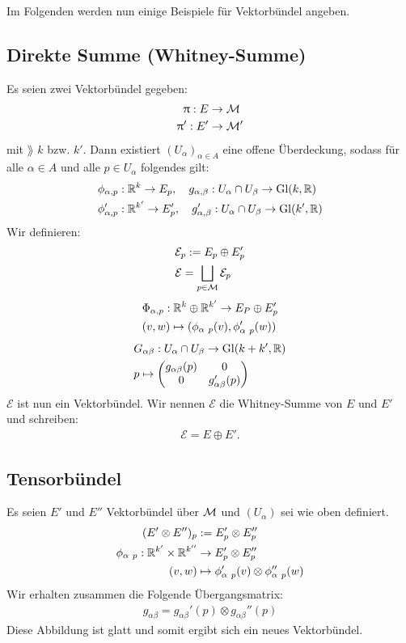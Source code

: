 Im Folgenden werden nun einige Beispiele für Vektorbündel angeben.
\subsection{Direkte Summe (Whitney-Summe)}
Es seien zwei Vektorbündel gegeben:
\begin{align}
\uppi : E &\to \mathcal{M} \\
\uppi ' : E' & \to \mathcal{M} '
\end{align}
mit $\rang$ $k$ bzw. $k'$. 
Dann existiert $(U_\alpha)_{\alpha \in A}$ eine offene Überdeckung, sodass für alle $\alpha \in A$ und alle $p \in U_\alpha$ folgendes gilt:
\begin{align}
&\phi_{\alpha, p}: \mathbb{R}^k \to E_p, \quad g_{\alpha, \beta}: U_\alpha \cap U_\beta \to \mathrm{Gl}(k, \mathbb{R})\\
&\phi_{\alpha, p}': \mathbb{R}^{k'} \to E_{p}', \quad g_{\alpha, \beta}': U_\alpha \cap U_\beta \to \mathrm{Gl}(k', \mathbb{R})
\end{align}  
Wir definieren:
\begin{align}
&\mathcal{E}_p := E_p \oplus E_{p}'\\
&\mathcal{E} = \bigsqcup_{p \in \mathcal{M}} \mathcal{E}_p
\end{align}
\begin{align}
&\Phi_{\alpha, p}: \mathbb{R}^k \oplus \mathbb{R}^{k'} \to E_P \oplus E_{p}'\\
&(v, w) \mapsto (\phi_{\alpha \ p} (v), \phi_{\alpha \ p}' (w))
\end{align}
\begin{align}
&G_{\alpha \beta}: U_\alpha \cap U_\beta \to \mathrm{Gl}(k + k', \mathbb{R})\\
&p \mapsto \begin{pmatrix}
g_{\alpha \beta}(p)  & 0 \\ 
0  & g_{\alpha \beta}'(p)
\end{pmatrix} 
\end{align}
$\mathcal{E}$ ist nun ein Vektorbündel. 
Wir nennen $\mathcal{E}$ die Whitney-Summe von $E$ und $E'$ und schreiben:
\begin{align}
\mathcal{E} = E \oplus E'.
\end{align} 

\subsection{Tensorbündel}
Es seien $E'$ und $E''$ Vektorbündel über $\mathcal{M}$ und $(U_\alpha)$ sei wie oben definiert.
\begin{align}
(E' \otimes E'')_p &:= E_{p}'\otimes E_{p}''\\
\phi_{\alpha \ p} : \mathbb{R}^{k'} \times \mathbb{R}^{k''} &\to E_{p}' \otimes E_{p}''\\
(v, w) &\mapsto \phi_{\alpha \ p}'(v) \otimes \phi_{\alpha \ p}'' (w)
\end{align}
Wir erhalten zusammen die Folgende Übergangsmatrix:
\begin{align}
g_{\alpha \beta} = g_{\alpha \beta}'(p) \otimes g_{\alpha \beta}''(p)
\end{align}
Diese Abbildung ist glatt und somit ergibt sich ein neues Vektorbündel.

